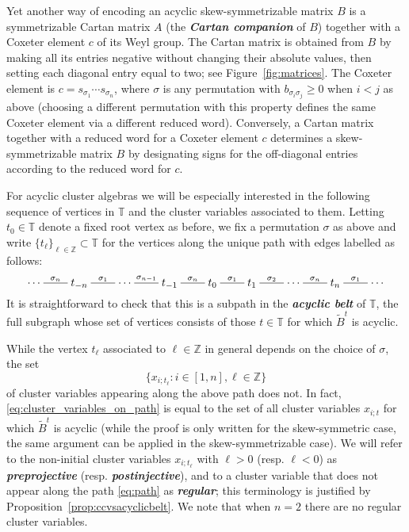 \documentclass[12pt]{amsart}
\newcommand{\newword}[1]{\textbf{\emph{#1}}}
\newcommand{\TT}{\mathbb{T}}
\newcommand{\ZZ}{\mathbb{Z}}
\newcommand{\dashname}[1]{\stackrel{#1}{\begin{picture}(22,3)\put(0,2.5){\line(1,0){22}}\end{picture}}}
\newcommand{\Zidx}{\ell}
\theoremstyle{remark}
\numberwithin{equation}{section}
\numberwithin{figure}{section}
\begin{document}
Yet another way of encoding an acyclic skew-symmetrizable matrix $B$ is a symmetrizable Cartan matrix $A$ (the \newword{Cartan companion} of $B$) together with a Coxeter element $c$ of its Weyl group.
The Cartan matrix is obtained from $B$ by making all its entries negative without changing their absolute values, then setting each diagonal entry equal to two; see Figure~\ref{fig:matrices}.
The Coxeter element is $c = s_{\sigma_1}\cdots s_{\sigma_n}$, where $\sigma$ is any permutation with $b_{\sigma_i \sigma_j} \geq 0$ when $i < j$ as above (choosing a different permutation with this property defines the same Coxeter element via a different reduced word).
Conversely, a Cartan matrix together with a reduced word for a Coxeter element $c$ determines a skew-symmetrizable matrix $B$ by designating signs for the off-diagonal entries according to the reduced word for $c$.

For acyclic cluster algebras we will be especially interested in the following sequence of vertices in $\TT$ and the cluster variables associated to them.
Letting $t_0 \in \TT$ denote a fixed root vertex as before, we fix a permutation $\sigma$ as above and write $\{t_\Zidx\}_{\Zidx \in \ZZ} \subset \TT$ for the vertices along the unique path with edges labelled as follows:
\begin{equation}
  \cdots
  \dashname{\sigma_n}
  t_{-n}
  \dashname{\sigma_1}
  \cdots
  \dashname{\sigma_{n-1}}
  t_{-1}
  \dashname{\sigma_n}
  t_0
  \dashname{\sigma_1}
  t_1
  \dashname{\sigma_2}
  \cdots
  \dashname{\sigma_n}
  t_n
  \dashname{\sigma_1}
  \cdots
  \label{eq:path}
\end{equation}
It is straightforward to check that this is a subpath in the \newword{acyclic belt} of $\TT$, the full subgraph whose set of vertices consists of those $t \in \TT$ for which $\widetilde{B}^t$ is acyclic.

While the vertex $t_\ell$ associated to $\Zidx \in \ZZ$ in general depends on the choice of $\sigma$, the set
\begin{equation}
  \label{eq:cluster_variables_on_path}
  \{x_{i;t_\Zidx}: i \in [1,n], \Zidx \in \ZZ\}
\end{equation}
of cluster variables appearing along the above path does not.
In fact, \eqref{eq:cluster_variables_on_path} is equal to the set of all cluster variables $x_{i;t}$ for which $\widetilde{B}^t$ is acyclic \cite[Corollary 4]{CK06} (while the proof is only written for the skew-symmetric case, the same argument can be applied in the skew-symmetrizable case).
We will refer to the non-initial cluster variables $x_{i;t_\Zidx}$ with $\Zidx>0$ (resp. $\Zidx<0$) as \newword{preprojective} (resp. \newword{postinjective}), and to a cluster variable that does not appear along the path \eqref{eq:path} as \newword{regular}; this terminology is justified by Proposition~\ref{prop:ccvsacyclicbelt}.
We note that when $n=2$ there are no regular cluster variables.
\end{document}
